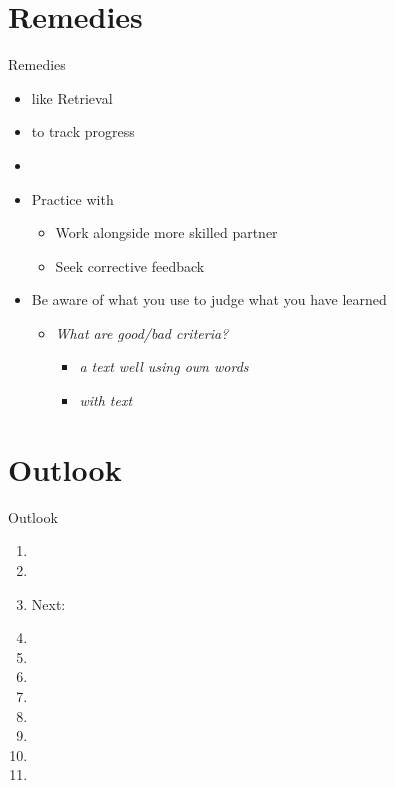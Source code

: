 \documentclass{ercisbeamer}
\begin{document}
\section{Remedies}
\begin{frame}{Remedies}
    \begin{itemize}
        \item {} like Retrieval
        \item {} to track progress
        \item {}
        \item Practice with 
        \begin{itemize}
            \item Work alongside more skilled partner
            \item Seek corrective feedback
        \end{itemize}
        \item Be aware of what  you use to judge what you have learned
        \begin{itemize}
            \item \emph{What are good/bad criteria?} \pause
            \begin{itemize}
                \item \emph{ a text well using own words}
                \item \emph{ with text}
            \end{itemize}
        \end{itemize}
    \end{itemize}
\end{frame}

\section*{Outlook}
\begin{frame}{Outlook}
    \begin{enumerate}
        \item {}
        \vspace{.5em}
        \item {}
        \item Next: 
        \item {}
        \item {}
        \item {}
        \vspace{.5em}
        \item {}
        \item {}
        \item {}
        \item {}
        \item {}
    \end{enumerate}
\end{frame}


\sources
\end{document}
